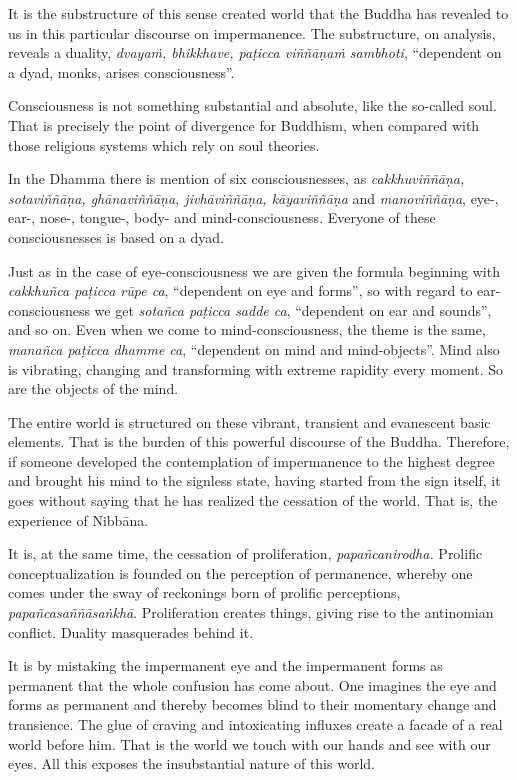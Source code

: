 It is the substructure of this sense created world that the Buddha has revealed to us in this particular discourse on impermanence. The substructure, on analysis, reveals a duality, \emph{dvayaṁ, bhikkhave, paṭicca viññāṇaṁ sambhoti}, ``dependent on a dyad, monks, arises consciousness''.

Consciousness is not something substantial and absolute, like the so-called soul. That is precisely the point of divergence for Buddhism, when compared with those religious systems which rely on soul theories.

In the Dhamma there is mention of six consciousnesses, as \emph{cakkhuviññāṇa, sotaviññāṇa, ghānaviññāṇa, jivhāviññāṇa, kāyaviññāṇa} and \emph{manoviññāṇa}, eye-, ear-, nose-, tongue-, body- and mind-consciousness. Everyone of these consciousnesses is based on a dyad.

Just as in the case of eye-consciousness we are given the formula beginning with \emph{cakkhuñca paṭicca rūpe ca}, ``dependent on eye and forms'', so with regard to ear-consciousness we get \emph{sotañca paṭicca sadde ca}, ``dependent on ear and sounds'', and so on. Even when we come to mind-consciousness, the theme is the same, \emph{manañca paṭicca dhamme ca}, ``dependent on mind and mind-objects''. Mind also is vibrating, changing and transforming with extreme rapidity every moment. So are the objects of the mind.

The entire world is structured on these vibrant, transient and evanescent basic elements. That is the burden of this powerful discourse of the Buddha. Therefore, if someone developed the contemplation of impermanence to the highest degree and brought his mind to the signless state, having started from the sign itself, it goes without saying that he has realized the cessation of the world. That is, the experience of Nibbāna.

It is, at the same time, the cessation of proliferation, \emph{papañcanirodha.} Prolific conceptualization is founded on the perception of permanence, whereby one comes under the sway of reckonings born of prolific perceptions, \emph{papañcasaññāsaṅkhā}. Proliferation creates things, giving rise to the antinomian conflict. Duality masquerades behind it.

It is by mistaking the impermanent eye and the impermanent forms as permanent that the whole confusion has come about. One imagines the eye and forms as permanent and thereby becomes blind to their momentary change and transience. The glue of craving and intoxicating influxes create a facade of a real world before him. That is the world we touch with our hands and see with our eyes. All this exposes the insubstantial nature of this world.


